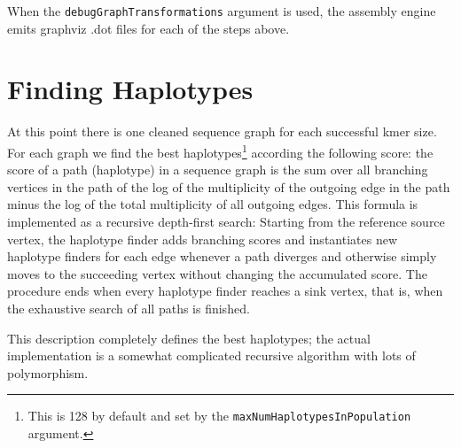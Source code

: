 \documentclass[nofootinbib,amssymb,amsmath]{revtex4}
\newcommand{\code}[1]{\texttt{#1}}
\begin{document}
When the \code{debugGraphTransformations} argument is used, the assembly engine emits graphviz .dot files for each of the steps above.

\section{Finding Haplotypes} \label{finding-haplotypes}
At this point there is one cleaned sequence graph for each successful kmer size.  For each graph we find the best haplotypes\footnote{This is 128 by default and set by the \code{maxNumHaplotypesInPopulation} argument.} according the following score: the score of a path (haplotype) in a sequence graph is the sum over all branching vertices in the path of the log of the multiplicity of the outgoing edge in the path minus the log of the total multiplicity of all outgoing edges.  This formula is implemented as a recursive depth-first search: Starting from the reference source vertex, the haplotype finder adds branching scores and instantiates new haplotype finders for each edge whenever a path diverges and otherwise simply moves to the succeeding vertex without changing the accumulated score.  The procedure ends when every haplotype finder reaches a sink vertex, that is, when the exhaustive search of all paths is finished.


This description completely defines the best haplotypes; the actual implementation is a somewhat complicated recursive algorithm with lots of polymorphism.
\end{document}
